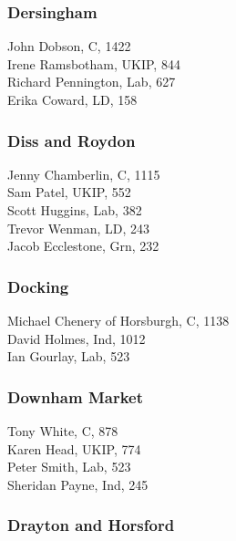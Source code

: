 \documentclass[a4paper,openany,10pt]{book}
\begin{document}
\subsubsection*{Dersingham}



John Dobson, C, 1422\\
Irene Ramsbotham, UKIP, 844\\
Richard Pennington, Lab, 627\\
Erika Coward, LD, 158\\


\subsubsection*{Diss and Roydon}



Jenny Chamberlin, C, 1115\\
Sam Patel, UKIP, 552\\
Scott Huggins, Lab, 382\\
Trevor Wenman, LD, 243\\
Jacob Ecclestone, Grn, 232\\


\subsubsection*{Docking}



Michael Chenery of Horsburgh, C, 1138\\
David Holmes, Ind, 1012\\
Ian Gourlay, Lab, 523\\


\subsubsection*{Downham Market}



Tony White, C, 878\\
Karen Head, UKIP, 774\\
Peter Smith, Lab, 523\\
Sheridan Payne, Ind, 245\\


\subsubsection*{Drayton and Horsford}
\end{document}
